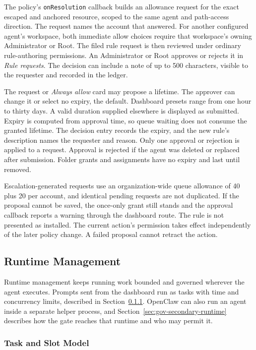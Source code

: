 {\color{red}The policy's \texttt{onResolution} callback builds an allowance request for the
exact escaped and anchored resource, scoped to the same agent and path-access
direction. The request names the account that answered. For another configured
agent's workspace, both immediate allow choices require that workspace's
owning Administrator or Root. The filed rule request is then reviewed under
ordinary rule-authoring permissions. An Administrator or Root approves or
rejects it in \textit{Rule requests}. The decision can include a note of up to
500 characters, visible to the requester and recorded in the ledger.

The request or \textit{Always allow} card may propose a lifetime. The approver
can change it or select no expiry, the default. Dashboard presets range from
one hour to thirty days. A valid duration supplied elsewhere is displayed as
submitted. Expiry is computed from approval time, so queue waiting does not
consume the granted lifetime. The decision entry records the expiry, and the
new rule's description names the requester and reason. Only one approval or
rejection is applied to a request. Approval is rejected if the agent was deleted or replaced after
submission. Folder grants and assignments have no expiry and last until
removed.

Escalation-generated requests use an organization-wide queue allowance of
40 plus 20 per account, and identical pending requests are not duplicated.
If the proposal cannot be saved, the once-only grant still stands and the
approval callback reports a warning through the dashboard route. The rule is
not presented as installed. The current action's permission takes effect
independently of the later policy change. A failed proposal cannot retract
the action.}

\FloatBarrier
\subsection{Runtime Management}
\label{sec:gov-runs}

Runtime management keeps running work bounded and governed wherever the
agent executes. Prompts sent from the dashboard run as tasks with time and
concurrency limits, described in Section~\ref{sec:gov-task-slot}. OpenClaw
can also run an agent inside a separate helper process, and
Section~\ref{sec:gov-secondary-runtime} describes how the gate reaches that
runtime and who may permit it.

\subsubsection{Task and Slot Model}
\label{sec:gov-task-slot}

